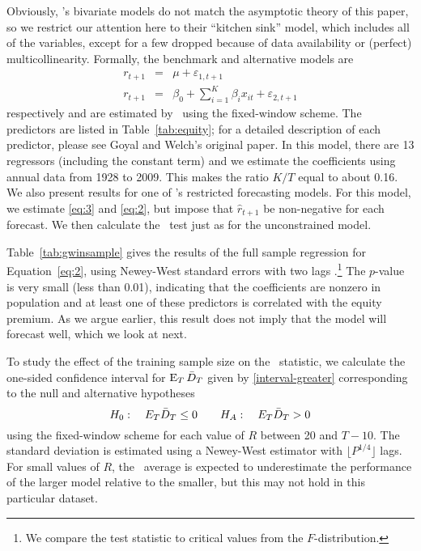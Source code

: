 \documentclass[11pt]{article}
\newcommand{\e}{\varepsilon}
\newcommand{\citepos}[1]{\citeauthor{#1}'s \citeyearpar{#1}}
\begin{document}
Obviously, \citepos{GoW:08} bivariate models do not
match the asymptotic theory of this paper, so we restrict our
attention here to their ``kitchen sink'' model, which includes all of
the variables, except for a few dropped because of data availability or
(perfect) multicollinearity.  Formally, the benchmark and alternative models are
\begin{eqnarray}
  \label{eq:3}
  r_{t+1} &=& \mu + \e_{1,t+1} \\
  \label{eq:2}
r_{t+1} &=& \beta_0 + \sum_{i=1}^K \beta_{i} x_{it} + \e_{2,t+1}
\end{eqnarray}
respectively and are estimated by \ols\ using the fixed-window scheme.
The predictors are listed in Table~\ref{tab:equity}; for a detailed
description of each predictor, please see Goyal and Welch's original
paper.  In this model, there are 13 regressors (including the constant
term) and we estimate the coefficients using annual data from 1928 to
2009.  This makes the ratio $K/T$ equal to about 0.16.  We also
present results for one of \citepos{CaT:08}
restricted forecasting models.  For this model, we estimate
\eqref{eq:3} and \eqref{eq:2}, but impose that $\hat r_{t+1}$ be
non-negative for each forecast.  We then calculate the \oos\ test just
as for the unconstrained model.

Table~\ref{tab:gwinsample} gives the results of the full sample
regression for Equation~\eqref{eq:2}, using Newey-West standard errors
with two lags \citep{NeW:87}.\footnote{We compare the test statistic
  to critical values from the $F$-distribution.}  The $p$-value is
very small (less than 0.01), indicating that the coefficients are
nonzero in population and at least one of these predictors is
correlated with the equity premium.  As we argue earlier, this result
does not imply that the model will forecast well, which we look at
next.

To study the effect of the training sample size on the \dmw\ statistic, we
calculate the one-sided confidence interval for $\operatorname{E}_T \bar{D}_{T}$ given
by \eqref{interval-greater} corresponding to the null and alternative
hypotheses
\[ H_0: \quad E_T \bar{D}_{T} \leq 0 \qquad
H_A: \quad E_T \bar{D}_{T} > 0
\]
using the fixed-window scheme for each value of $R$ between 20 and
$T-10$.  The standard deviation is estimated using a Newey-West
estimator with $\lfloor P^{1/4}\rfloor$ lags.  For small values of
$R$, the \oos\ average is expected to underestimate the performance of
the larger model relative to the smaller, but this may not hold in
this particular dataset.
\end{document}
